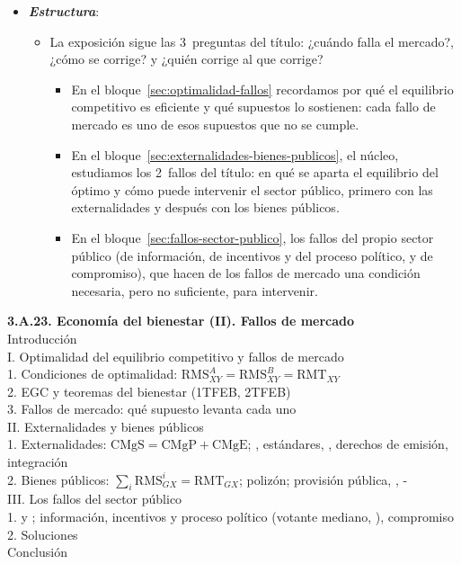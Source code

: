 \documentclass[11pt]{article}
\begin{document}
\begin{itemize}
\item \textbf{\emph{Estructura}}:
  \begin{itemize}
  \item La exposición sigue las 3~preguntas del título: ¿cuándo falla el mercado?, ¿cómo se corrige? y ¿quién corrige al que corrige?
  \begin{itemize}
  \item En el bloque~\ref{sec:optimalidad-fallos} recordamos por qué el equilibrio competitivo es eficiente y qué supuestos lo sostienen: cada fallo de mercado es uno de esos supuestos que no se cumple.
  \item En el bloque~\ref{sec:externalidades-bienes-publicos}, el núcleo, estudiamos los 2~fallos del título: en qué se aparta el equilibrio del óptimo y cómo puede intervenir el sector público, primero con las externalidades y después con los bienes públicos.
  \item En el bloque~\ref{sec:fallos-sector-publico}, los fallos del propio sector público (de información, de incentivos y del proceso político, y de compromiso), que hacen de los fallos de mercado una condición necesaria, pero no suficiente, para intervenir.
  \end{itemize}
  \end{itemize}
\end{itemize}

\begin{esquema}
\textbf{3.A.23. Economía del bienestar (II). Fallos de mercado}\\[2pt]
Introducción\\
I. Optimalidad del equilibrio competitivo y fallos de mercado\\
\hspace*{1.5em}1. Condiciones de optimalidad: $\mathrm{RMS}^A_{XY}=\mathrm{RMS}^B_{XY}=\mathrm{RMT}_{XY}$\\
\hspace*{1.5em}2. EGC y teoremas del bienestar (1TFEB, 2TFEB)\\
\hspace*{1.5em}3. Fallos de mercado: qué supuesto levanta cada uno\\
II. Externalidades y bienes públicos\\
\hspace*{1.5em}1. Externalidades: $\mathrm{CMgS}=\mathrm{CMgP}+\mathrm{CMgE}$; , estándares, , derechos de emisión, integración\\
\hspace*{1.5em}2. Bienes públicos: $\sum_i\mathrm{RMS}^i_{GX}=\mathrm{RMT}_{GX}$; polizón; provisión pública, , -\\
III. Los fallos del sector público\\
\hspace*{1.5em}1.  y ; información, incentivos y proceso político (votante mediano, ), compromiso\\
\hspace*{1.5em}2. Soluciones\\
Conclusión
\end{esquema}
\end{document}
